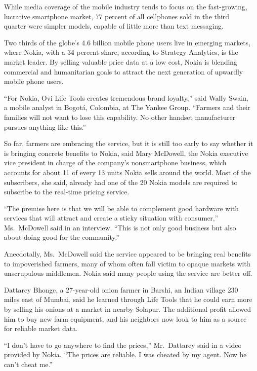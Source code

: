 ﻿\documentclass[12pt]{article}
\begin{document}
While media coverage of the mobile industry tends to focus on the fast-growing, lucrative smartphone
market, 77 percent of all cellphones sold in the third quarter were simpler models, capable of
little more than text messaging.

Two thirds of the globe's 4.6 billion mobile phone users live in emerging markets, where Nokia, with
a 34 percent share, according to Strategy Analytics, is the market leader. By selling valuable price
data at a low cost, Nokia is blending commercial and humanitarian goals to attract the next
generation of upwardly mobile phone users.

``For Nokia, Ovi Life Tools creates tremendous brand loyalty,'' said Wally Swain, a mobile analyst
in Bogot\'a, Colombia, at The Yankee Group. ``Farmers and their families will not want to lose this
capability. No other handset manufacturer pursues anything like this.''

So far, farmers are embracing the service, but it is still too early to say whether it is bringing
concrete benefits to Nokia, said Mary McDowell, the Nokia executive vice president in charge of the
company's nonsmartphone business, which accounts for about 11 of every 13 units Nokia sells around
the world. Most of the subscribers, she said, already had one of the 20 Nokia models are required to
subscribe to the real-time pricing service.

``The premise here is that we will be able to complement good hardware with services that will
attract and create a sticky situation with consumer,'' Ms.~McDowell said in an interview. ``This is
not only good business but also about doing good for the community.''

Anecdotally, Ms.~McDowell said the service appeared to be bringing real benefits to impoverished
farmers, many of whom often fall victim to opaque markets with unscrupulous middlemen. Nokia said
many people using the service are better off.

Dattarey Bhonge, a 27-year-old onion farmer in Barshi, an Indian village 230 miles east of Mumbai,
said he learned through Life Tools that he could earn more by selling his onions at a market in
nearby Solapur. The additional profit allowed him to buy new farm equipment, and his neighbors now
look to him as a source for reliable market data.

``I don't have to go anywhere to find the prices,'' Mr.~Dattarey said in a video provided by Nokia.
``The prices are reliable. I was cheated by my agent. Now he can't cheat me.''
\end{document}
